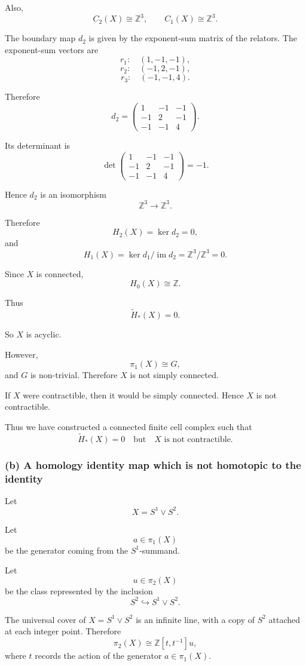 \documentclass[12pt,a4paper]{article}
\theoremstyle{notespace}
\begin{document}
Also,
\[
C_2(X)\cong \mathbb Z^3,
\qquad
C_1(X)\cong \mathbb Z^3.
\]

The boundary map \(d_2\) is given by the exponent-sum matrix of the relators. The exponent-sum vectors are
\[
r_1:\quad (1,-1,-1),
\]
\[
r_2:\quad (-1,2,-1),
\]
\[
r_3:\quad (-1,-1,4).
\]

Therefore
\[
d_2
=
\begin{pmatrix}
	1 & -1 & -1\\
	-1 & 2 & -1\\
	-1 & -1 & 4
\end{pmatrix}.
\]

Its determinant is
\[
\det
\begin{pmatrix}
	1 & -1 & -1\\
	-1 & 2 & -1\\
	-1 & -1 & 4
\end{pmatrix}
=
-1.
\]

Hence \(d_2\) is an isomorphism
\[
\mathbb Z^3\to \mathbb Z^3.
\]

Therefore
\[
H_2(X)=\ker d_2=0,
\]
and
\[
H_1(X)=\ker d_1/\operatorname{im}d_2
=
\mathbb Z^3/\mathbb Z^3
=
0.
\]

Since \(X\) is connected,
\[
H_0(X)\cong \mathbb Z.
\]

Thus
\[
\widetilde H_*(X)=0.
\]

So \(X\) is acyclic.

However,
\[
\pi_1(X)\cong G,
\]
and \(G\) is non-trivial. Therefore \(X\) is not simply connected.

If \(X\) were contractible, then it would be simply connected. Hence \(X\) is not contractible.

Thus we have constructed a connected finite cell complex such that
\[
\boxed{
	\widetilde H_*(X)=0
	\quad
	\text{but}
	\quad
	X\text{ is not contractible.}
}
\]

\subsubsection*{(b) A homology identity map which is not homotopic to the identity}

Let
\[
X=S^1\vee S^2.
\]

Let
\[
a\in \pi_1(X)
\]
be the generator coming from the \(S^1\)-summand.

Let
\[
u\in \pi_2(X)
\]
be the class represented by the inclusion
\[
S^2\hookrightarrow S^1\vee S^2.
\]

The universal cover of \(X=S^1\vee S^2\) is an infinite line, with a copy of \(S^2\) attached at each integer point. Therefore
\[
\pi_2(X)\cong \mathbb Z[t,t^{-1}]u,
\]
where \(t\) records the action of the generator \(a\in \pi_1(X)\).
\end{document}
